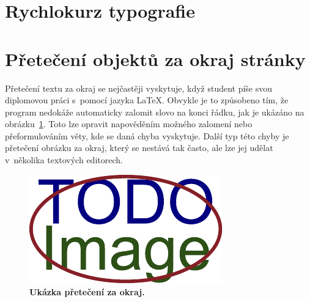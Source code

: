 \section{Rychlokurz typografie}
\DummyText


\section{Přetečení objektů za okraj stránky}
Přetečení textu za okraj se nejčastěji vyskytuje, když student píše svou diplomovou
práci s~pomocí jazyka {\LaTeX}. Obvykle je to způsobeno tím, že program nedokáže
automaticky zalomit slovo na konci řádku, jak je ukázáno na
obrázku~\ref{pic_overflow}. Toto lze opravit napověděním možného
zalomení nebo přeformulováním věty, kde se daná chyba vyskytuje.
Další typ této chyby je přetečení obrázku za okraj,
který se nestává tak často, ale lze jej udělat v~několika textových editorech.

\begin{figure}[H]
    \centering
    \includegraphics{obrazky-figures/placeholder.pdf}
    \caption{\textbf{Ukázka přetečení za okraj.} }
    \label{pic_overflow}
\end{figure}


